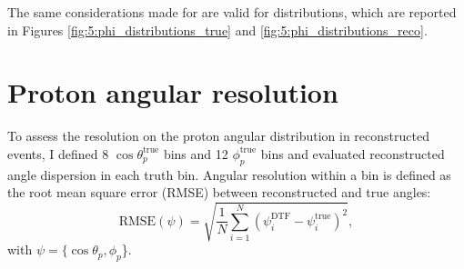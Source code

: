 The same considerations made for \cthetap are valid for \phip distributions, which are reported in Figures \ref{fig:5:phi_distributions_true} and \ref{fig:5:phi_distributions_reco}.

\section{Proton angular resolution}
\label{sec:5:angular_resolution}

To assess the resolution on the proton angular distribution in reconstructed \demonstratorshort events, I defined 8 $\cos\theta_p^\text{true}$ bins and 12 $\phi_p^\text{true}$ bins and evaluated reconstructed angle dispersion in each truth bin. 
Angular resolution within a bin is defined as the root mean square error (RMSE) between reconstructed and true angles:
\begin{equation}
	\text{RMSE}(\psi) = \sqrt{\frac{1}{N} \sum_{i=1}^N {\left(\psi_i^\text{DTF} - \psi_i^\text{true}\right)}^2},
\end{equation}
with $\psi = \{\cos\theta_p, \phi_p$\}.

